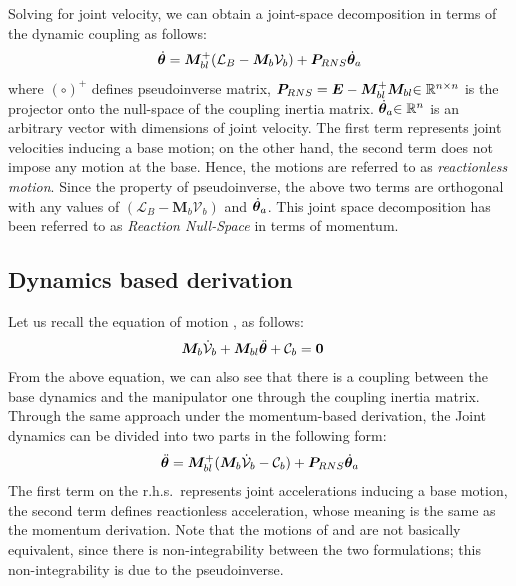 Solving  for joint velocity,
we can obtain a joint-space decomposition in terms of the dynamic coupling as follows:
%
\begin{align}
  {\dot{\bm{\theta}}} = \bm{M}_{bl}^{+}(\mathcal{L}_{B} - \bm{M}_{b}\mathcal{V}_{b}) + \bm{P}_{RNS}{\dot{\bm{\theta}}}_{a}\label{eq:RNS_VEL}
\end{align}
%
where $(\circ)^{+}$ defines pseudoinverse matrix,
$\bm{P}_{RNS} = \bm{E} - \bm{M}_{bl}^{+}\bm{M}_{bl}{\in\mathbb{R}^{n \times n}}$ is the projector onto the null-space of
the coupling inertia matrix.
${\dot{\bm{\theta}}}_{a}{\in\mathbb{R}^{n}}$ is an arbitrary vector with dimensions of joint velocity.
The first term represents joint velocities inducing a base motion;
on the other hand,
the second term does not impose any motion at the base.
Hence, the motions are referred to as \textit{reactionless motion}.
Since the property of pseudoinverse,
the above two terms are orthogonal with any values of $(\mathcal{L}_{B} - \bm{M}_{b}\mathcal{V}_{b})$ and
${\dot{\bm{\theta}}}_{a}$.
This joint space decomposition has been referred to as
\textit{Reaction Null-Space} in terms of momentum.


\subsection{Dynamics based derivation}
Let us recall the equation of motion , as follows:
%
\begin{align}
  \bm{M}_{b}\dot{\mathcal{V}}_{b} + \bm{M}_{bl}{\ddot{\bm{\theta}}} + \mathcal{C}_{b} &= \bm{0}
\end{align}
%
From the above equation, we can also see that there is
a coupling between the base dynamics and the manipulator one
through the coupling inertia matrix.
Through the same approach under the momentum-based derivation,
the Joint dynamics can be divided into two parts in the following form:
%
\begin{align}
  {\ddot{\bm{\theta}}} = \bm{M}_{bl}^{+}(\bm{M}_{b}\dot{\mathcal{V}}_{b} - \mathcal{C}_{b}) + \bm{P}_{RNS}{\dot{\bm{\theta}}}_{a}\label{eq:RNS_ACC}
\end{align}
%
The first term on the r.h.s.\ represents joint accelerations inducing a base motion,
the second term defines reactionless acceleration, whose meaning is the same as the momentum derivation.
Note that the motions of  and  are not basically equivalent,
since there is non-integrability between the two formulations;
this non-integrability is due to the pseudoinverse.


